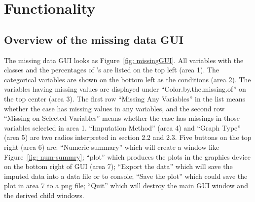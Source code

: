 \documentclass[article]{jss}
\begin{document}
\section{Functionality}

\subsection{Overview of the missing data GUI}

The missing data GUI looks as Figure~\ref{fig: missingGUI}. All variables with the classes and the percentages of 's are listed on the top left (area 1). The categorical variables are shown on the bottom left as the conditions (area 2). The variables having missing values are displayed under ``Color.by.the.missing.of'' on the top center (area 3). The first row ``Missing Any Variables'' in the list means whether the case has missing values in any variables, and the second row ``Missing on Selected Variables'' means whether the case has missings in those variables selected in area 1. ``Imputation Method'' (area 4) and ``Graph Type'' (area 5) are two radios interpreted in section 2.2 and 2.3. Five buttons on the top right (area 6) are: ``Numeric summary'' which will create a window like Figure~\ref{fig: num-summry}; ``plot'' which produces the plots in the graphics device on the bottom right of GUI (area 7); ``Export the data'' which will save the imputed data into a data file or to  console; ``Save the plot'' which could save the plot in area 7 to a png file; ``Quit'' which will destroy the main GUI window and the derived child windows.
\end{document}

